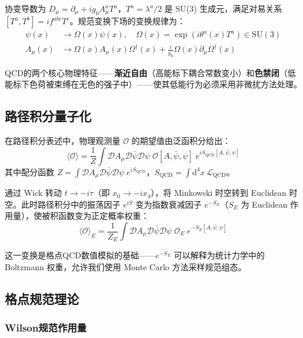 \documentclass[11pt,a4paper]{ctexart}
\begin{document}
协变导数为 $D_\mu = \partial_\mu + i g_0 A_\mu^a T^a$，$T^a = \lambda^a/2$ 是 SU(3) 生成元，满足对易关系 $[T^a, T^b] = i f^{abc} T^c$。规范变换下场的变换规律为：
\begin{align}
\psi(x) &\to \Omega(x) \psi(x), \quad \Omega(x) = \exp(i \theta^a(x) T^a) \in \text{SU}(3) \\
A_\mu(x) &\to \Omega(x) A_\mu(x) \Omega^\dagger(x) + \frac{i}{g_0} \Omega(x) \partial_\mu \Omega^\dagger(x)
\end{align}

QCD的两个核心物理特征——\textbf{渐近自由}（高能标下耦合常数变小）和\textbf{色禁闭}（低能标下色荷被束缚在无色的强子中）——使其低能行为必须采用非微扰方法处理。

\subsection{路径积分量子化}

在路径积分表述中，物理观测量 $\mathcal{O}$ 的期望值由泛函积分给出：
\begin{equation}
\langle \mathcal{O} \rangle = \frac{1}{Z} \int \mathcal{D}A_\mu \mathcal{D}\bar{\psi} \mathcal{D}\psi \; \mathcal{O}[A,\bar{\psi},\psi] \; e^{i S_{\text{QCD}}[A,\bar{\psi},\psi]}
\end{equation}
其中配分函数 $Z = \int \mathcal{D}A_\mu \mathcal{D}\bar{\psi} \mathcal{D}\psi \; e^{i S_{\text{QCD}}}$，$S_{\text{QCD}} = \int \mathrm{d}^4 x \, \mathcal{L}_{\text{QCD}}$。

通过 Wick 转动 $t \to -i\tau$（即 $x_0 \to -i x_4$），将 Minkowski 时空转到 Euclidean 时空。此时路径积分中的振荡因子 $e^{iS}$ 变为指数衰减因子 $e^{-S_E}$（$S_E$ 为 Euclidean 作用量），使被积函数变为正定概率权重：
\begin{equation}
\langle \mathcal{O} \rangle_E = \frac{1}{Z_E} \int \mathcal{D}A_\mu \mathcal{D}\bar{\psi} \mathcal{D}\psi \; \mathcal{O}_E \; e^{-S_E[A,\bar{\psi},\psi]}
\end{equation}

这一变换是格点QCD数值模拟的基础——$e^{-S_E}$ 可以解释为统计力学中的 Boltzmann 权重，允许我们使用 Monte Carlo 方法采样规范组态。

\subsection{格点规范理论}

\subsubsection{Wilson规范作用量}
\end{document}
